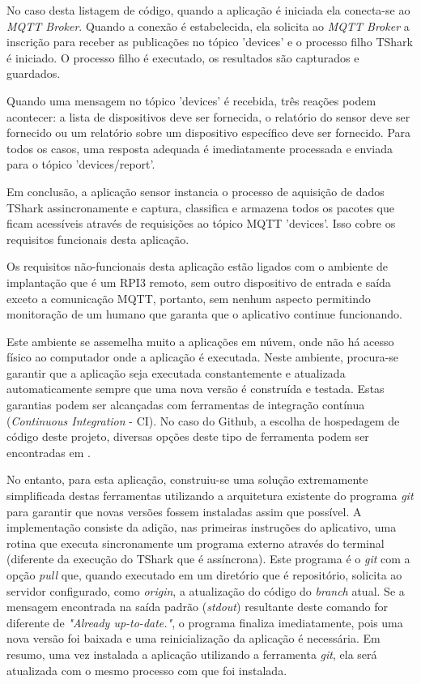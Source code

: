 No caso desta listagem de código, quando a aplicação é iniciada ela conecta-se ao \emph{MQTT Broker}.
Quando a conexão é estabelecida, ela solicita ao \emph{MQTT Broker} a inscrição
para receber as publicações no tópico 'devices' e o processo filho TShark
é iniciado. O processo filho é executado, os resultados são capturados e
guardados.

Quando uma mensagem no tópico 'devices' é recebida, três reações podem acontecer:
a lista de dispositivos deve ser fornecida, o relatório do sensor deve ser
fornecido ou um relatório sobre um dispositivo específico deve ser fornecido.
Para todos os casos, uma resposta adequada é imediatamente processada e enviada
para o tópico 'devices/report'.

Em conclusão, a aplicação sensor instancia o processo de aquisição de dados
TShark assincronamente e captura, classifica e armazena todos os pacotes
que ficam acessíveis através de requisições ao tópico MQTT 'devices'.
Isso cobre os requisitos funcionais desta aplicação.

Os requisitos não-funcionais desta aplicação estão ligados com o ambiente de
implantação que é um RPI3 remoto, sem outro dispositivo de entrada e saída
exceto a comunicação MQTT, portanto, sem nenhum aspecto permitindo
monitoração de um humano que garanta que o aplicativo continue funcionando.

Este ambiente se assemelha muito a aplicações em núvem, onde não há acesso
físico ao computador onde a aplicação é executada. Neste ambiente, procura-se
garantir que a aplicação seja executada constantemente e atualizada
automaticamente sempre que uma nova versão é construída e testada. Estas
garantias podem ser alcançadas com ferramentas de integração contínua
(\emph{Continuous Integration} - CI). No caso do Github, a escolha de hospedagem
de código deste projeto, diversas opções deste tipo de ferramenta podem ser
encontradas em .

No entanto, para esta aplicação, construiu-se uma solução extremamente
simplificada destas ferramentas utilizando a arquitetura existente do programa
\emph{git} para garantir que novas versões fossem instaladas assim que possível.
A implementação consiste da adição, nas primeiras instruções do aplicativo,
uma rotina que executa sincronamente um programa externo através do terminal
(diferente da execução do TShark que é assíncrona). Este programa é
o \emph{git} com a opção \emph{pull} que, quando executado em um diretório que
é repositório, solicita ao servidor configurado, como \emph{origin}, a atualização
do código do \emph{branch} atual. Se a mensagem encontrada na saída padrão
(\emph{stdout}) resultante deste comando for diferente de
\emph{"Already up-to-date."}, o programa finaliza imediatamente, pois uma nova
versão foi baixada e uma reinicialização da aplicação é necessária.
Em resumo, uma vez instalada a aplicação utilizando a ferramenta \emph{git}, ela
será atualizada com o mesmo processo com que foi instalada.

